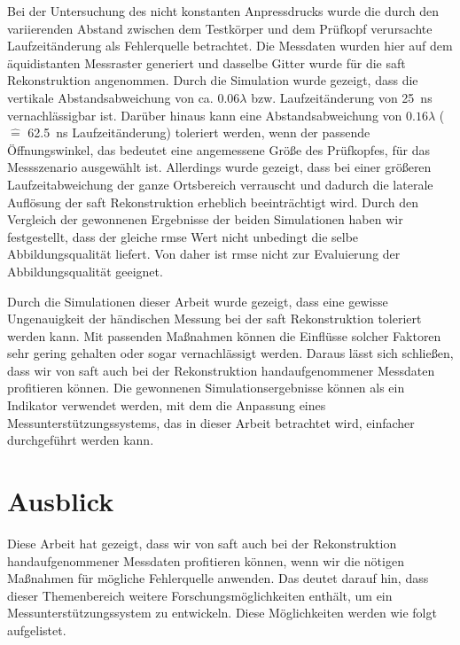 Bei der Untersuchung des nicht konstanten Anpressdrucks wurde die durch den variierenden Abstand zwischen dem Testkörper und dem Prüfkopf verursachte Laufzeitänderung als Fehlerquelle betrachtet. Die Messdaten wurden hier auf dem äquidistanten Messraster generiert und dasselbe Gitter wurde für die \acrshort{saft} Rekonstruktion angenommen. Durch die Simulation wurde gezeigt, dass die vertikale Abstandsabweichung von ca. $0.06 \lambda$ bzw. Laufzeitänderung von \SI{25}{\nano\second} vernachlässigbar ist. Darüber hinaus kann eine Abstandsabweichung von $0.16 \lambda$ ($\hat{=}$ \SI{62.5}{\nano\second} Laufzeitänderung) toleriert werden, wenn der passende Öffnungswinkel, das bedeutet eine angemessene Größe des Prüfkopfes, für das Messszenario ausgewählt ist. Allerdings wurde gezeigt, dass bei einer größeren Laufzeitabweichung der ganze Ortsbereich verrauscht und dadurch die laterale Auflösung der \acrshort{saft} Rekonstruktion erheblich beeinträchtigt wird. Durch den Vergleich der gewonnenen Ergebnisse der beiden Simulationen haben wir festgestellt, dass der gleiche \acrshort{rmse} Wert nicht unbedingt die selbe Abbildungsqualität liefert. Von daher ist \acrshort{rmse} nicht zur Evaluierung der Abbildungsqualität geeignet. \par
Durch die Simulationen dieser Arbeit wurde gezeigt, dass eine gewisse Ungenauigkeit der händischen Messung bei der \acrshort{saft} Rekonstruktion toleriert werden kann. Mit passenden Maßnahmen können die Einflüsse solcher Faktoren sehr gering gehalten oder sogar vernachlässigt werden. Daraus lässt sich schließen, dass wir von \acrshort{saft} auch bei der Rekonstruktion handaufgenommener Messdaten profitieren können. Die gewonnenen Simulationsergebnisse können als ein Indikator verwendet werden, mit dem die Anpassung eines Messunterstützungssystems, das in dieser Arbeit betrachtet wird, einfacher durchgeführt werden kann.


\section{Ausblick}
Diese Arbeit hat gezeigt, dass wir von \acrshort{saft} auch bei der Rekonstruktion handaufgenommener Messdaten profitieren können, wenn wir die nötigen Maßnahmen für mögliche Fehlerquelle anwenden. Das deutet darauf hin, dass dieser Themenbereich weitere Forschungsmöglichkeiten enthält, um ein Messunterstützungssystem zu entwickeln. Diese Möglichkeiten werden wie folgt aufgelistet. 

